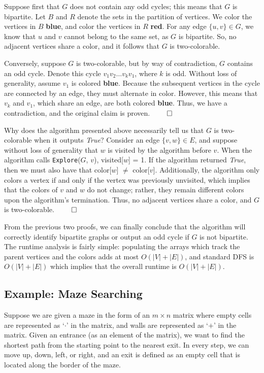 \documentclass[11pt]{article}
\begin{document}
Suppose first that $G$ does not contain any odd cycles; this means that $G$ is bipartite. Let $B$ and $R$ denote the sets in the partition of vertices. We color the vertices in $B$ \textcolor{DeepSkyBlue3}{\textbf{blue}}, and color the vertices in $R$ \textcolor{Maroon0}{\textbf{red}}. For any edge $\{u, v \} \in G$, we know that $u$ and $v$ cannot belong to the same set, as $G$ is bipartite. So, no adjacent vertices share a color, and it follows that $G$ is two-colorable. 

Conversely, suppose $G$ is two-colorable, but by way of contradiction, $G$ contains an odd cycle. Denote this cycle $v_1v_2\dots v_kv_1$, where $k$ is odd. Without loss of generality, assume $v_1$ is colored \textcolor{DeepSkyBlue3}{\textbf{blue}}. Because the subsequent vertices in the cycle are connected by an edge, they must alternate in color. However, this means that $v_k$ and $v_1$, which share an edge, are both colored \textcolor{DeepSkyBlue3}{\textbf{blue}}. Thus, we have a contradiction, and the original claim is proven. \hfill $\qed$ 

Why does the algorithm presented above necessarily tell us that $G$ is two-colorable when it outputs \emph{True}? Consider an edge $\{v, w\} \in E$, and suppose without loss of generality that $w$ is visited by the algorithm before $v$. When the algorithm calls \texttt{Explore}($G$, $v$), visited[$w$] = 1. If the algorithm returned \emph{True}, then we must also have that color[$w$] $\neq$ color[$v$]. Additionally, the algorithm only colors a vertex if and only if the vertex was previously unvisited, which implies that the colors of $v$ and $w$ do not change; rather, they remain different colors upon the algorithm's termination. Thus, no adjacent vertices share a color, and $G$ is two-colorable. \hfill $\qed$

From the previous two proofs, we can finally conclude that the algorithm will correctly identify bipartite graphs or output an odd cycle if $G$ is not bipartite. The runtime analysis is fairly simple: populating the arrays which track the parent vertices and the colors adds at most $O(|V| + |E|)$, and standard DFS is $O(|V| + |E|)$ which implies that the overall runtime is $O(|V| + |E|)$. 

\subsection{Example: Maze Searching}
Suppose we are given a maze in the form of an $m \times n$ matrix where empty cells are represented as `$\cdot$' in the matrix, and walls are represented as `$+$' in the matrix. Given an entrance (as an element of the matrix), we want to find the shortest path from the starting point to the nearest exit. In every step, we can move up, down, left, or right, and an exit is defined as an empty cell that is located along the border of the maze. 
\end{document}
